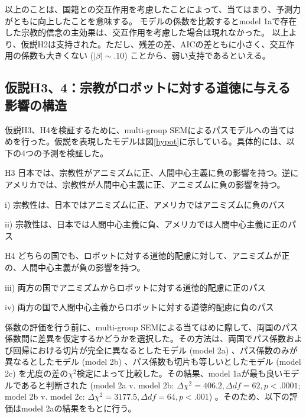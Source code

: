\documentclass[a4j,12pt]{jreport}
\begin{document}
以上のことは、国籍との交互作用を考慮したことによって、当てはまり、予測力がともに向上したことを意味する。
モデルの係数を比較するとmodel 1aで存在した宗教的信念の主効果は、交互作用を考慮した場合は現れなかった。
以上より、仮説H2は支持された。ただし、残差の差、AICの差ともに小さく、交互作用の係数も大きくない ($|\beta| \sim .10$) ことから、弱い支持であるといえる。



\subsection{仮説H3、4：宗教がロボットに対する道徳に与える影響の構造}
仮説H3、H4を検証するために、multi-group SEMによるパスモデルへの当てはめを行った。仮説を表現したモデルは図\ref{hypot}に示している。具体的には、以下の4つの予測を検証した。
\begin{description}
\item{H3} 日本では、宗教性がアニミズムに正、人間中心主義に負の影響を持つ。逆にアメリカでは、宗教性が人間中心主義に正、アニミズムに負の影響を持つ。
\begin{description}
\item{i) } 宗教性は、日本ではアニミズムに正、アメリカではアニミズムに負のパス
\item{ii)} 宗教性は、日本では人間中心主義に負、アメリカでは人間中心主義に正のパス
\end{description}


\item{H4} どちらの国でも、ロボットに対する道徳的配慮に対して、アニミズムが正の、人間中心主義が負の影響を持つ。
\begin{description}
\item{iii)} 両方の国でアニミズムからロボットに対する道徳的配慮に正のパス
\item{iv)} 両方の国で人間中心主義からロボットに対する道徳的配慮に負のパス
\end{description}
\end{description}


係数の評価を行う前に、multi-group SEMによる当てはめに際して、両国のパス係数間に差異を仮定するかどうかを選択した。その方法は、両国でパス係数および回帰における切片が完全に異なるとしたモデル (model 2a) 、パス係数のみが異なるとしたモデル (model 2b) 、パス係数も切片も等しいとしたモデル (model 2c) を尤度の差の$\chi ^2$検定によって比較した。その結果、model 1aが最も良いモデルであると判断された (model 2a v. model 2b: $\Delta \chi ^2 = 406.2, \Delta df = 62, p < .0001$; model 2b v. model 2c: $\Delta \chi ^2 = 3177.5, \Delta df = 64, p < .001$) 。そのため、以下の評価はmodel 2aの結果をもとに行う。
\end{document}
